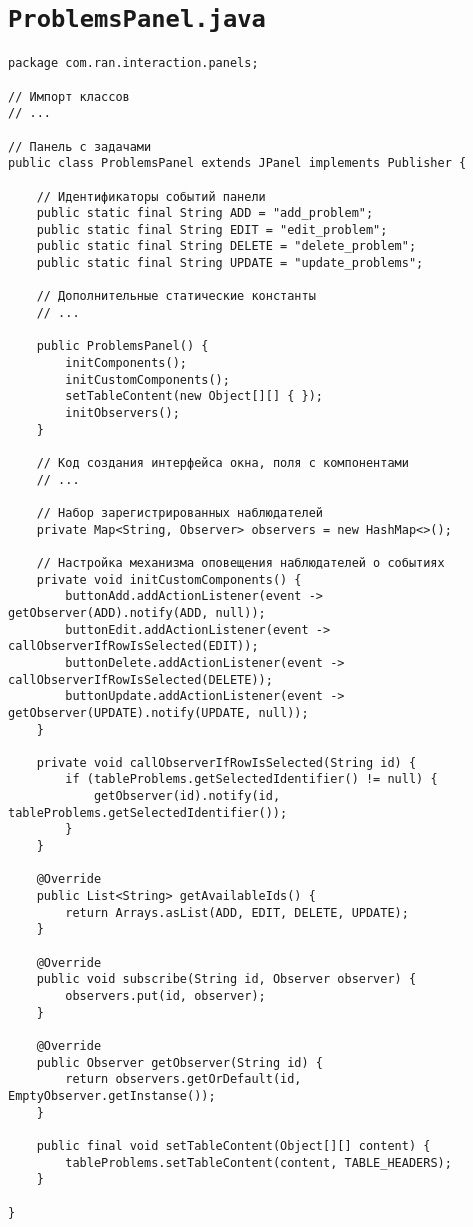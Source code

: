 \section*{\texttt{ProblemsPanel.java}}
\begin{verbatim}
package com.ran.interaction.panels;

// Импорт классов
// ...

// Панель с задачами
public class ProblemsPanel extends JPanel implements Publisher {
    
    // Идентификаторы событий панели
    public static final String ADD = "add_problem";
    public static final String EDIT = "edit_problem";
    public static final String DELETE = "delete_problem";
    public static final String UPDATE = "update_problems";
    
    // Дополнительные статические константы
    // ...
    
    public ProblemsPanel() {
        initComponents();
        initCustomComponents();
        setTableContent(new Object[][] { });
        initObservers();
    }

    // Код создания интерфейса окна, поля с компонентами
    // ...

    // Набор зарегистрированных наблюдателей
    private Map<String, Observer> observers = new HashMap<>();
    
    // Настройка механизма оповещения наблюдателей о событиях
    private void initCustomComponents() {
        buttonAdd.addActionListener(event -> getObserver(ADD).notify(ADD, null));
        buttonEdit.addActionListener(event -> callObserverIfRowIsSelected(EDIT));
        buttonDelete.addActionListener(event -> callObserverIfRowIsSelected(DELETE));
        buttonUpdate.addActionListener(event -> getObserver(UPDATE).notify(UPDATE, null));
    }
    
    private void callObserverIfRowIsSelected(String id) {
        if (tableProblems.getSelectedIdentifier() != null) {
            getObserver(id).notify(id, tableProblems.getSelectedIdentifier());
        }
    }
    
    @Override
    public List<String> getAvailableIds() {
        return Arrays.asList(ADD, EDIT, DELETE, UPDATE);
    }
    
    @Override
    public void subscribe(String id, Observer observer) {
        observers.put(id, observer);
    }

    @Override
    public Observer getObserver(String id) {
        return observers.getOrDefault(id, EmptyObserver.getInstanse());
    }
    
    public final void setTableContent(Object[][] content) {
        tableProblems.setTableContent(content, TABLE_HEADERS);
    }
    
}
\end{verbatim}

